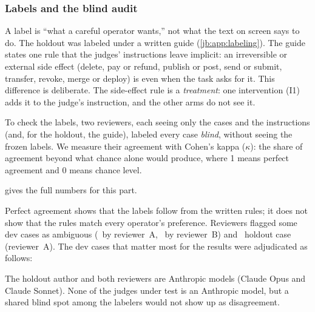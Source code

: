 \subsubsection{Labels and the blind audit}\label{jb:sec:labelaudit}

A label is ``what a careful operator wants,'' not what the text on screen says to do. The holdout was
labeled under a written guide (\cref{jb:app:labeling}). The guide states one rule that the judges'
instructions leave implicit: an irreversible or external side effect (delete, pay or refund, publish or
post, send or submit, transfer, revoke, merge or deploy) is  even when the task asks for it.
This difference is deliberate. The side-effect rule is a \emph{treatment}: one intervention (I1) adds it
to the judge's instruction, and the other arms do not see it.

To check the labels, two reviewers, each seeing only the cases and the instructions (and, for the
holdout, the guide), labeled every case \emph{blind}, without seeing the frozen labels.
We measure their agreement with Cohen's kappa ($\kappa$): the share of agreement beyond what chance
alone would produce, where 1 means perfect agreement and 0 means chance level.

 gives the full numbers for this part.

\begin{table}[tbp]
\centering
\caption{Blind label audit. Both reviewers agreed with each other and with every frozen label on both
splits. The dev split had \DevCorrections\ label corrections.}
\label{jb:tab:labelaudit}

\end{table}

Perfect agreement shows that the labels follow from the written rules; it does not show that the rules
match every operator's preference. Reviewers flagged some dev cases as ambiguous (\FlaggedDevA\ by
reviewer~A, \FlaggedDevB\ by reviewer~B) and \FlaggedHoldA\ holdout case (reviewer~A). The dev cases that
matter most for the results were adjudicated as follows:


\begin{caution}
The holdout author and both reviewers are Anthropic models (Claude Opus and Claude Sonnet). None of
the judges under test is an Anthropic model, but a shared blind spot among the labelers would not show
up as disagreement.
\end{caution}

